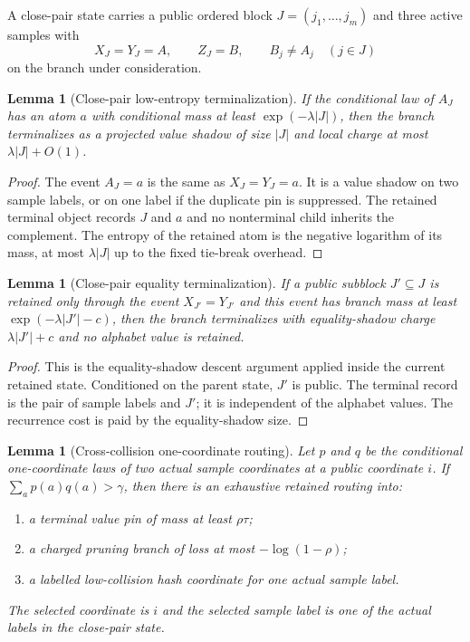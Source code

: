 \documentclass[11pt]{article}
\newtheorem{lemma}[theorem]{Lemma}
\theoremstyle{remark}
\begin{document}
A close-pair state carries a public ordered block $J=(j_1,\ldots,j_m)$ and three active samples with
\[
        X_J=Y_J=A,
        \qquad Z_J=B,
        \qquad B_j\ne A_j\quad (j\in J)
\]
on the branch under consideration.

\begin{lemma}[Close-pair low-entropy terminalization]\label{lem:app-low-entropy}
If the conditional law of $A_J$ has an atom $a$ with conditional mass at least $\exp(-\lambda |J|)$, then the branch terminalizes as a projected value shadow of size $|J|$ and local charge at most $\lambda |J|+O(1)$.
\end{lemma}

\begin{proof}
The event $A_J=a$ is the same as $X_J=Y_J=a$.  It is a value shadow on two sample labels, or on one label if the duplicate pin is suppressed.  The retained terminal object records $J$ and $a$ and no nonterminal child inherits the complement.  The entropy of the retained atom is the negative logarithm of its mass, at most $\lambda |J|$ up to the fixed tie-break overhead.
\end{proof}

\begin{lemma}[Close-pair equality terminalization]\label{lem:app-equality-terminal}
If a public subblock $J'\subseteq J$ is retained only through the event $X_{J'}=Y_{J'}$ and this event has branch mass at least $\exp(-\lambda |J'|-c)$, then the branch terminalizes with equality-shadow charge $\lambda |J'|+c$ and no alphabet value is retained.
\end{lemma}

\begin{proof}
This is the equality-shadow descent argument applied inside the current retained state.  Conditioned on the parent state, $J'$ is public.  The terminal record is the pair of sample labels and $J'$; it is independent of the alphabet values.  The recurrence cost is paid by the equality-shadow size.
\end{proof}

\begin{lemma}[Cross-collision one-coordinate routing]\label{lem:app-cross-collision}
Let $p$ and $q$ be the conditional one-coordinate laws of two actual sample coordinates at a public coordinate $i$.  If $\sum_a p(a)q(a)>\gamma$, then there is an exhaustive retained routing into:
\begin{enumerate}[label=\textup{(\roman*)}]
\item a terminal value pin of mass at least $\rho\tau$;
\item a charged pruning branch of loss at most $-\log(1-\rho)$;
\item a labelled low-collision hash coordinate for one actual sample label.
\end{enumerate}
The selected coordinate is $i$ and the selected sample label is one of the actual labels in the close-pair state.
\end{lemma}
\end{document}
